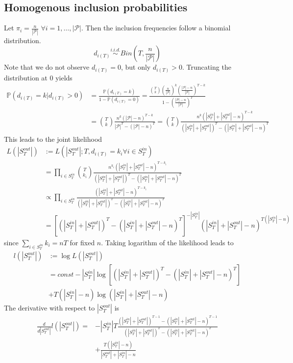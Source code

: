 \documentclass[a4paper, 12pt]{article}
\newcommand{\sout}[1][T]{|S^{out}_{#1}|}
\newcommand{\sint}[1][T]{|S^{in}_{#1}|}
\newcommand{\pop}{|\mathcal{P}|}
\begin{document}
\subsection{Homogenous inclusion probabilities}
Let $\pi_i = \frac{n}{\pop}$ $\forall i = 1, \dots, \pop$. Then the inclusion frequencies follow a binomial distribution.
\begin{equation*}
d_{i(T)} \overset{i.i.d.}{\sim} Bin(T, \frac{n}{\pop})
\end{equation*}
Note that we do not observe $d_{i(T)} = 0$, but only $d_{i(T)} > 0$. Truncating the distribution at 0 yields
\begin{align*}
\mathbb{P}(d_{i(T)} = k|d_{i(T)} > 0) &= \frac{\mathbb{P}(d_{i(T)} = k)}{1 - \mathbb{P}(d_{i(T)} = 0)} = \frac{\binom{T}{k} (\frac{n}{\pop})^k (\frac{\pop - n}{\pop})^{T - k}}{1 - (\frac{\pop - n}{\pop})^T}\\
&= \binom{T}{k} \frac{n^k (\pop - n)^{T-k}}{\pop^{T} - (\pop - n)^T} = \binom{T}{k} \frac{n^k (\sint + \sout - n)^{T-k}}{(\sint + \sout)^{T} - (\sint + \sout - n)^T}
\end{align*}
This leads to the joint likelihood
\begin{align*}
L(\sout) &:= L(\sout; T, d_{i(T)} = k_i \forall i \in S_T^{in}) \\
&= \prod_{i \in S_T^{in}} \binom{T}{k_i} \frac{n^{k_i} (\sint + \sout - n)^{T-k_i}}{(\sint + \sout)^{T} - (\sint + \sout - n)^T} \\
&\propto \prod_{i \in S_T^{in}} \frac{(\sint + \sout - n)^{T-k_i}}{(\sint + \sout)^{T} - (\sint + \sout - n)^T} \\
&= [(\sint + \sout)^{T} - (\sint + \sout - n)^T]^{-\sint} (\sint + \sout - n)^{T(\sint  - n)}
\end{align*}
since $\sum_{i \in S_T^{in}} k_i = nT$ for fixed $n$. Taking logarithm of the likelihood leads to
\begin{align}
l(\sout) &:= \log L(\sout) \nonumber \\
&= const - \sint \log[(\sint + \sout)^{T} - (\sint + \sout - n)^T]\nonumber \\ 
&+ T(\sint  - n) \log (\sint + \sout - n)
\end{align}
The derivative with respect to $\sout$ is
\begin{align}
\frac{d}{d\sout}l(\sout) =& -\sint T \frac{(\sint + \sout)^{T-1} - (\sint + \sout - n)^{T-1}}{(\sint + \sout)^{T} - (\sint + \sout - n)^T} \nonumber \\
&+ \frac{T(\sint  - n)}{\sout + \sint - n}
\end{align}
\end{document}
